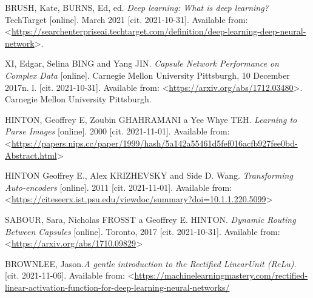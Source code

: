 

\begin{thebibliography}{99}
	
    BRUSH, Kate, BURNS, Ed, ed. \emph{Deep learning: What is deep learning? } TechTarget [online]. March 2021 [cit. 2021-10-31]. 
    Available from: <\url {https://searchenterpriseai.techtarget.com/definition/deep-learning-deep-neural-network}>.

    XI, Edgar, Selina BING and Yang JIN. \emph{Capsule Network Performance on Complex Data} [online]. Carnegie Mellon University Pittsburgh, 10 December 2017n. l. [cit. 2021-10-31].
    Available from: <\url{https://arxiv.org/abs/1712.03480}>. Carnegie Mellon University Pittsburgh.

HINTON, Geoffrey E, Zoubin GHAHRAMANI a Yee Whye TEH. \emph{Learning to Parse Images} [online]. 2000 [cit. 2021-11-01]. 
Available from: <\url{https://papers.nips.cc/paper/1999/hash/5a142a55461d5fef016acfb927fee0bd-Abstract.html}>

    HINTON Geoffrey E., Alex KRIZHEVSKY and Side D. Wang. \emph{Transforming Auto-encoders }[online]. 2011 [cit. 2021-11-01]. 
    Available from: <\url{https://citeseerx.ist.psu.edu/viewdoc/summary?doi=10.1.1.220.5099}>

    SABOUR, Sara, Nicholas FROSST a Geoffrey E. HINTON. \emph{Dynamic Routing Between Capsules }[online]. Toronto, 2017 [cit. 2021-10-31]. 
    Available from: <\url{https://arxiv.org/abs/1710.09829}>

    BROWNLEE, Jason.\emph{A gentle introduction to the Rectified LinearUnit (ReLu)}. [cit. 2021-11-06].
    Available from: <\url{https://machinelearningmastery.com/rectified-linear-activation-function-for-deep-learning-neural-networks/}

\end{thebibliography}



%
%
%
